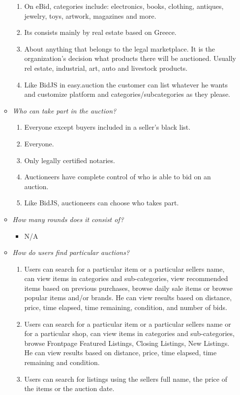 \documentclass[letterpaper,twocolumn,10pt]{article}
\begin{document}
\begin{itemize}
\begin{itemize}
\begin{enumerate}
    \item On eBid, categories include: electronics, books, clothing, antiques, jewelry, toys, artwork, magazines and more.
    \item Its consists mainly by real estate based on Greece.
    \item About anything that belongs to the legal marketplace. It is the organization's decision what products there will be auctioned. Usually rel estate, industrial, art, auto and livestock products.
    \item Like BidJS in easy.auction the customer can list whatever he wants and customize platform and categories/subcategories as they please.
    \end{enumerate}
\item \emph{Who can take part in the auction?}
    \begin{enumerate}
    \item Everyone except buyers included in a seller's black list.
    \item Everyone.
    \item Only legally certified notaries.
    \item Auctioneers have complete control of who is able to bid on an auction.
    \item Like BidJS, auctioneers can choose who takes part.
    \end{enumerate}    
\item \emph{How many rounds does it consist of?}
    \begin{itemize}
    \item N/A
    \end{itemize}
\item \emph{How do users find particular auctions?}
    \begin{enumerate}
    \item Users can search for a particular item or a particular sellers name, can view items in categories and sub-categories, view recommended items based on previous purchases, browse daily sale items or browse popular items and/or brands. He can view results based on distance, price, time elapsed, time remaining, condition, and number of bids.
    \item Users can search for a particular item or a particular sellers name or for a particular shop, can view items in categories and sub-categories, browse Frontpage Featured Listings, Closing Listings, New Listings. He can view results based on distance, price, time elapsed, time remaining and condition.
    \item Users can search for listings using the sellers full name, the price of the items or the auction date.

\end{enumerate}
\end{itemize}
\end{itemize}
\end{document}
